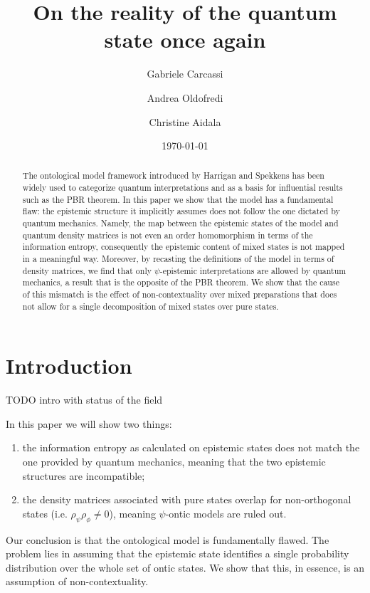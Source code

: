 \documentclass[twocolumn,prl,floatfix,superscriptaddress]{revtex4-2}
\begin{document}
\title{On the reality of the quantum state once again}
\author{Gabriele Carcassi}
\author{Andrea Oldofredi}
\author{Christine Aidala}
\vspace{2mm}

\date{\today}


\begin{abstract}
The ontological model framework introduced by Harrigan and Spekkens has been widely used to categorize quantum interpretations and as a basis for influential results such as the PBR theorem. In this paper we show that the model has a fundamental flaw: the epistemic structure it implicitly assumes does not follow the one dictated by quantum mechanics. Namely, the map between the epistemic states of the model and quantum density matrices is not even an order homomorphism in terms of the information entropy, consequently the epistemic content of mixed states is not mapped in a meaningful way. Moreover, by recasting the definitions of the model in terms of density matrices, we find that only $\psi$-epistemic interpretations are allowed by quantum mechanics, a result that is the opposite of the PBR theorem. We show that the cause of this mismatch is the effect of non-contextuality over mixed preparations that does not allow for a single decomposition of mixed states over pure states.
\end{abstract}

\maketitle

\section{Introduction}


TODO intro with status of the field

In this paper we will show two things:
\begin{enumerate}
	\item the information entropy as calculated on epistemic states does not match the one provided by quantum mechanics, meaning that the two epistemic structures are incompatible;
	\item the density matrices associated with pure states overlap for non-orthogonal states (i.e. $\rho_\psi \rho_\phi \neq 0$), meaning $\psi$-ontic models are ruled out.
\end{enumerate}
Our conclusion is that the ontological model is fundamentally flawed. The problem lies in assuming that the epistemic state identifies a single probability distribution over the whole set of ontic states. We show that this, in essence, is an assumption of non-contextuality.
\end{document}
